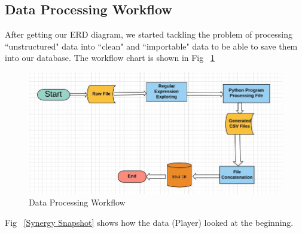 \documentclass[conference]{IEEEtran}
\begin{document}
\subsection{Data Processing Workflow}
After getting our ERD diagram, we started tackling the problem of processing ``unstructured" data into ``clean" and ``importable" data to be able to save them into our database. The workflow chart is shown in Fig ~\ref{Data Processing Workflow}

\begin{figure}[h!]
  \includegraphics[width=\linewidth]{data_processing.jpg}
  \caption{Data Processing Workflow}
  \vspace{-1mm}
  \label{Data Processing Workflow}
\end{figure}



Fig ~\ref{Synergy Snapshot} shows how the data (Player) looked at the beginning.
\end{document}
